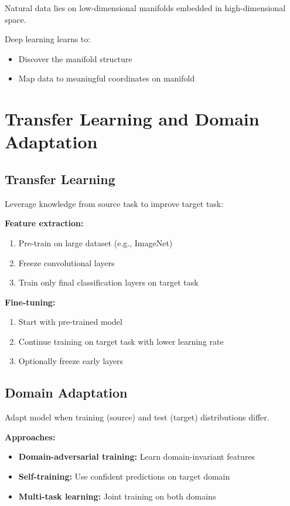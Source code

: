 Natural data lies on low-dimensional manifolds embedded in high-dimensional space.

Deep learning learns to:
\begin{itemize}
    \item Discover the manifold structure
    \item Map data to meaningful coordinates on manifold
\end{itemize}

\section{Transfer Learning and Domain Adaptation}
\label{sec:transfer-learning}

\subsection{Transfer Learning}

Leverage knowledge from source task to improve target task:

\textbf{Feature extraction:}
\begin{enumerate}
    \item Pre-train on large dataset (e.g., ImageNet)
    \item Freeze convolutional layers
    \item Train only final classification layers on target task
\end{enumerate}

\textbf{Fine-tuning:}
\begin{enumerate}
    \item Start with pre-trained model
    \item Continue training on target task with lower learning rate
    \item Optionally freeze early layers
\end{enumerate}

\subsection{Domain Adaptation}

Adapt model when training (source) and test (target) distributions differ.

\textbf{Approaches:}
\begin{itemize}
    \item \textbf{Domain-adversarial training:} Learn domain-invariant features
    \item \textbf{Self-training:} Use confident predictions on target domain
    \item \textbf{Multi-task learning:} Joint training on both domains
\end{itemize}

